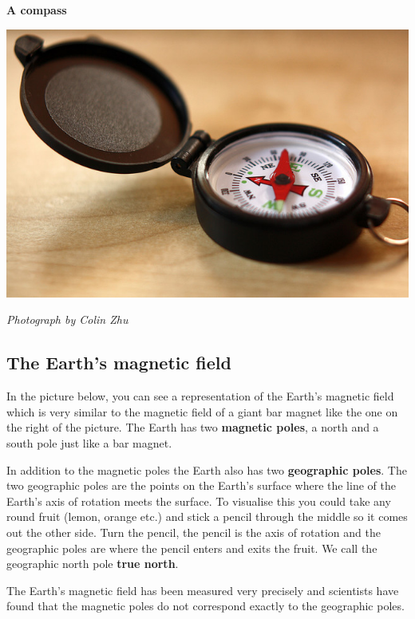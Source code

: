 \begin{minipage}{.5\textwidth}
\begin{center}
\textbf{A compass}\par
\includegraphics[width=.8\textwidth]{photos/Colin_ZHU.jpg}\par
\textit{Photograph by Colin Zhu}
\end{center}
\end{minipage}
       \label{m37830*uid22}
            \subsection*{The Earth's magnetic field}
            \nopagebreak
        \label{m37830*id128255}In the picture below, you can see a representation of the Earth's magnetic
field which is very similar to the magnetic field of a giant bar magnet like
the one on the right of the picture. The Earth has two \textbf{magnetic poles}, a north and a south pole just like a bar magnet.

In addition to the magnetic poles the Earth also has two \textbf{geographic poles}. The two geographic poles are the points on the Earth's surface where the line of the Earth's axis of rotation meets the surface. To visualise this you could take any round fruit (lemon, orange etc.) and stick a pencil through the middle so it comes out the other side. Turn the pencil, the pencil is the axis of rotation
and the geographic poles are where the pencil enters and exits the fruit. We call the geographic north pole \textbf{true north}.


The Earth's magnetic field has been measured very precisely and scientists have found that the magnetic poles do not correspond exactly to the geographic poles.

